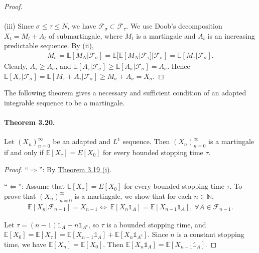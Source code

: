 \documentclass{article}
\numberwithin{equation}{section}
\newcommand{\E}{\mathbb{E}}
\theoremstyle{plain}
\theoremstyle{definition}
\begin{document}
\begin{proof}
\paragraph{} (iii) Since $\sigma\leq\tau\leq N$, we have $\mathscr{F}_\sigma\subset\mathscr{F}_\tau$. We use Doob's decomposition $X_t=M_t+A_t$ of submartingale, where $M_t$ is a martingale and $A_t$ is an increasing predictable sequence. By (ii),
\begin{align*}
	M_\sigma = \E[M_N|\mathscr{F}_\sigma] = \E[\E[M_N|\mathscr{F}_\tau]|\mathscr{F}_\sigma] = \E[M_\tau|\mathscr{F}_\sigma].
\end{align*}
Clearly, $A_\tau\geq A_\sigma$, and $\E[A_\tau|\mathscr{F}_\sigma]\geq\E[A_\sigma|\mathscr{F}_\sigma]=A_\sigma$. Hence $\E[X_\tau|\mathscr{F}_\sigma] = \E[M_\tau+A_\tau|\mathscr{F}_\sigma] \geq M_\sigma + A_\sigma = X_\sigma$.
\end{proof}

The following theorem gives a necessary and sufficient condition of an adapted integrable sequence to be a martingale.

\paragraph{Theorem 3.20.\label{thm:3.20}} Let $(X_n)_{n=0}^\infty$ be an adapted and $L^1$ sequence. Then $(X_n)_{n=0}^\infty$ is a martingale if and only if $\E[X_\tau]=E[X_0]$ for every bounded stopping time $\tau$.
\begin{proof}
``$\Rightarrow$'': By \hyperref[thm:3.19]{Theorem 3.19 (i)}.

``$\Leftarrow$'': Assume that $\E[X_\tau]=E[X_0]$ for every bounded stopping time $\tau$. To prove that $(X_n)_{n=0}^\infty$ is a martingale, we show that for each $n\in\mathbb{N}$,
\begin{align*}
	\E[X_n|\mathscr{F}_{n-1}]=X_{n-1} \Leftrightarrow\ \E[X_n\mathds{1}_A]=\E[X_{n-1}\mathds{1}_A],\ \forall A\in\mathscr{F}_{n-1}.
\end{align*}

Let $\tau=(n-1)\mathds{1}_{A}+n\mathds{1}_{A^c}$, so $\tau$ is a bounded stopping time, and $\E[X_0]=\E[X_\tau]=\E[X_{n-1}\mathds{1}_{A}]+\E[X_n\mathds{1}_{A^c}]$. Since $n$ is a constant stopping time, we have $\E[X_n]=\E[X_0]$. Then $\E[X_n\mathds{1}_{A}]=\E[X_{n-1}\mathds{1}_{A}]$.
\end{proof}
\end{document}
